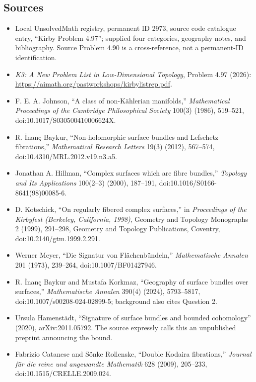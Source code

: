 \documentclass[11pt]{article}
\begin{document}
\subsection{Sources}
\begin{itemize}
\item Local UnsolvedMath registry, permanent ID 2973, source code catalogue entry, ``Kirby Problem 4.97''; supplied four categories, geography notes, and bibliography. Source Problem 4.90 is a cross-reference, not a permanent-ID identification.
\item \emph{K3: A New Problem List in Low-Dimensional Topology}, Problem 4.97 (2026): \url{https://aimath.org/pastworkshops/kirbylistrep.pdf}.
\item [Joh86] F. E. A. Johnson, ``A class of non-Kählerian manifolds,'' \emph{Mathematical Proceedings of the Cambridge Philosophical Society} 100(3) (1986), 519--521, doi:10.1017/S030500410006624X.
\item [Bay12b] R. İnanç Baykur, ``Non-holomorphic surface bundles and Lefschetz fibrations,'' \emph{Mathematical Research Letters} 19(3) (2012), 567--574, doi:10.4310/MRL.2012.v19.n3.a5.
\item [Hil00] Jonathan A. Hillman, ``Complex surfaces which are fibre bundles,'' \emph{Topology and Its Applications} 100(2--3) (2000), 187--191, doi:10.1016/S0166-8641(98)00085-6.
\item [Kot99] D. Kotschick, ``On regularly fibered complex surfaces,'' in \emph{Proceedings of the Kirbyfest (Berkeley, California, 1998)}, Geometry and Topology Monographs 2 (1999), 291--298, Geometry and Topology Publications, Coventry, doi:10.2140/gtm.1999.2.291.
\item [Mey73] Werner Meyer, ``Die Signatur von Flächenbündeln,'' \emph{Mathematische Annalen} 201 (1973), 239--264, doi:10.1007/BF01427946.
\item [BK24b] R. İnanç Baykur and Mustafa Korkmaz, ``Geography of surface bundles over surfaces,'' \emph{Mathematische Annalen} 390(4) (2024), 5793--5817, doi:10.1007/s00208-024-02899-5; background also cites Question 2.
\item [Ham20] Ursula Hamenstädt, ``Signature of surface bundles and bounded cohomology'' (2020), arXiv:2011.05792. The source expressly calls this an unpublished preprint announcing the bound.
\item [CR09] Fabrizio Catanese and Sönke Rollenske, ``Double Kodaira fibrations,'' \emph{Journal für die reine und angewandte Mathematik} 628 (2009), 205--233, doi:10.1515/CRELLE.2009.024.

\end{itemize}
\end{document}
